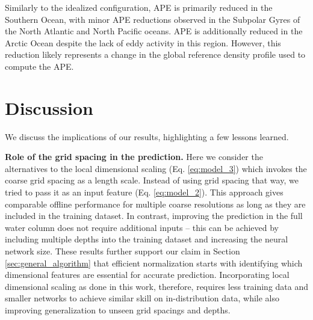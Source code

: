 \documentclass[draft]{agujournal2019}
\begin{document}
Similarly to the idealized configuration, APE is primarily reduced in the Southern Ocean, with minor APE reductions observed in the Subpolar Gyres of the North Atlantic and North Pacific oceans. APE is additionally reduced in the Arctic Ocean despite the lack of eddy activity in this region. However, this reduction likely represents a change in the global reference density profile used to compute the APE.


\section{Discussion}

We discuss the implications of our results, highlighting a few lessons learned. 

\textbf{Role of the grid spacing in the prediction.} Here we consider the alternatives to the local dimensional scaling (Eq. \eqref{eq:model_3}) which invokes the coarse grid spacing as a length scale. Instead of using grid spacing that way, we tried to pass it as an input feature (Eq. \eqref{eq:model_2}). This approach gives comparable offline performance for multiple coarse resolutions as long as they are included in the training dataset. In contrast, improving the prediction in the full water column does not require additional inputs -- this can be achieved by including multiple depths into the training dataset and increasing the neural network size.  These results further support our claim in Section \ref{sec:general_algorithm} that efficient normalization starts with identifying which dimensional features are essential for accurate prediction. Incorporating local dimensional scaling as done in this work, therefore, requires less training data and smaller networks to achieve similar skill on in-distribution data, while also improving generalization to unseen grid spacings and depths.

\end{document}
